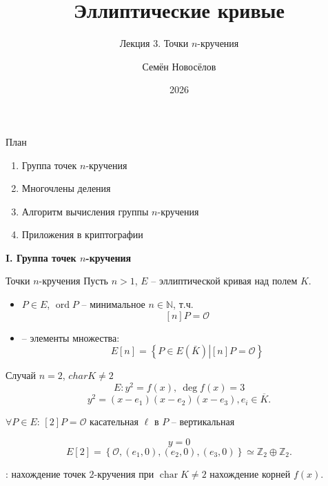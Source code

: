 \documentclass{beamer}
\title{Эллиптические кривые}
\subtitle{Лекция 3. Точки $n$-кручения}
\author{Семён Новосёлов}
\institute{БФУ им. И. Канта}
\date{2026}
\begin{document}
\frame{\titlepage}

\begin{frame}{План}
	\begin{enumerate}
		\item Группа точек $n$-кручения
		\item Многочлены деления
		\item Алгоритм вычисления группы $n$-кручения
		\item Приложения в криптографии
	\end{enumerate}
\end{frame}

\begin{frame}
	\begin{center}
		\textcolor{title-and-section-color}{{\LARGE \textbf{I. Группа точек $n$-кручения}}}
	\end{center}
\end{frame}

\begin{frame}{Точки $n$-кручения}
Пусть $n > 1$, $E$ -- эллиптической кривая над полем $K$.
\begin{itemize}
    \item {} $P \in E$, $\operatorname{ord} P$ -- минимальное $n \in \mathbb{N}$, т.ч.
    \[
    [n] P = \mathcal{O}
    \]
    \item {} -- элементы множества:
    \[
    E[n] = \left\{ {\left. P \in E(\bar K)\right| [n]P = \mathcal{O}} \right\}
    \]
\end{itemize}
\end{frame}


\begin{frame}{Случай $n=2$, $charK \ne 2$}
\[
E: {y^2} = f(x), ~ \deg f\left( x \right) = 3
\]
\structure{\[\Downarrow\]}
\[
y^2 = \left( {x - {e_1}} \right)\left( {x - {e_2}} \right)\left( {x - {e_3}} \right), e_i \in \overline{K}.
\]
\begin{center}
$\forall P \in E$: $[2] P = \mathcal{O}$ \structure{$\Leftrightarrow$} касательная $\ell$ в $P$ -- вертикальная
\end{center}
\structure{\[\Downarrow\]}
\[
y = 0
\]
\structure{\[\Downarrow\]}
\[
E[2] = \left\{ \mathcal{O}, (e_1, 0), (e_2 ,0), (e_3,0) \right\} \simeq \mathbb{Z}_2 \oplus \mathbb{Z}_2.
\]
    
: нахождение точек $2$-кручения при $\operatorname{char}K \ne 2$ \structure{$\Leftrightarrow$} нахождение корней $f(x)$.
\end{frame}
\end{document}
